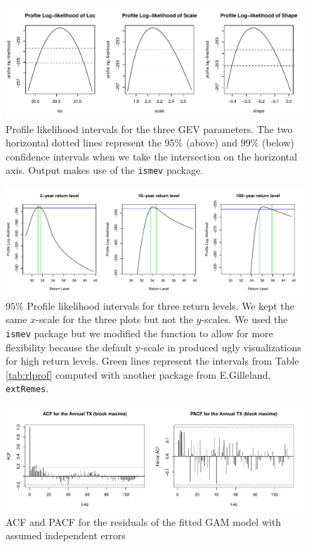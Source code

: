\begin{figure}[!htb]
\centering	\includegraphics[width=.85\linewidth]{proflikpar.pdf}\caption{ Profile likelihood intervals for the three GEV parameters. The two horizontal dotted lines represent the 95$\%$ (above) and $99\%$ (below) confidence intervals when we take the intersection on the horizontal axis. Output makes use of the \texttt{ismev} package.}\label{fig:proflikpar}
\end{figure}



\begin{figure}[!htb]
	\centering	\includegraphics[width=.95\linewidth]{proflikrl.pdf}\caption{ $95\%$ Profile likelihood intervals for three return levels. We kept the same $x$-scale for the three plots but not the $y$-scales. We used the \texttt{ismev} package but we modified the function to allow for more flexibility because the default y-scale in produced ugly visualizations for high return levels. Green lines represent the intervals from Table \ref{tab:rlprof} computed with another package from E.Gilleland, \texttt{extRemes}. }\label{fig:proflikrl}
\end{figure}


\begin{figure}[!htb]
	\centering	\includegraphics[width=.95\linewidth]{acf_gev.pdf}\caption{ACF and PACF for the residuals of the fitted GAM model with assumed independent errors}\label{fig:acf_gev}
\end{figure}





